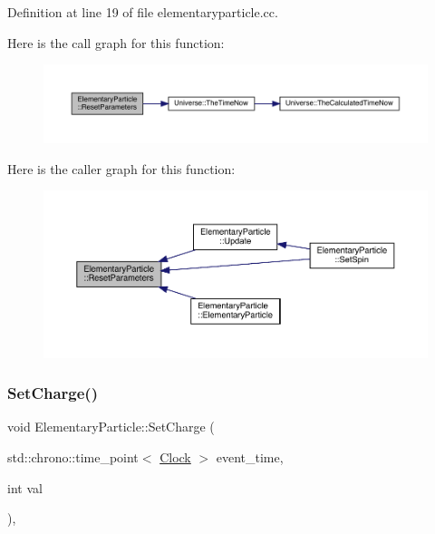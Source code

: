 Definition at line 19 of file elementaryparticle.\+cc.

Here is the call graph for this function\+:\nopagebreak
\begin{figure}[H]
\begin{center}
\leavevmode
\includegraphics[width=350pt]{class_elementary_particle_ac0f85f34bdfc1d42324201eb7c38e85e_cgraph}
\end{center}
\end{figure}
Here is the caller graph for this function\+:
\nopagebreak
\begin{figure}[H]
\begin{center}
\leavevmode
\includegraphics[width=350pt]{class_elementary_particle_ac0f85f34bdfc1d42324201eb7c38e85e_icgraph}
\end{center}
\end{figure}
\mbox{\label{class_elementary_particle_abbc6d3c58509c4121df55bfef716d2f1}} 
\subsubsection{\texorpdfstring{Set\+Charge()}{SetCharge()}}
{\footnotesize\ttfamily void Elementary\+Particle\+::\+Set\+Charge (\begin{DoxyParamCaption}\item[{std\+::chrono\+::time\+\_\+point$<$ \hyperlink{universe_8h_a0ef8d951d1ca5ab3cfaf7ab4c7a6fd80}{Clock} $>$}]{event\+\_\+time,  }\item[{int}]{val }\end{DoxyParamCaption})\hspace{0.3cm}{\ttfamily [inline]}, {\ttfamily [virtual]}}




